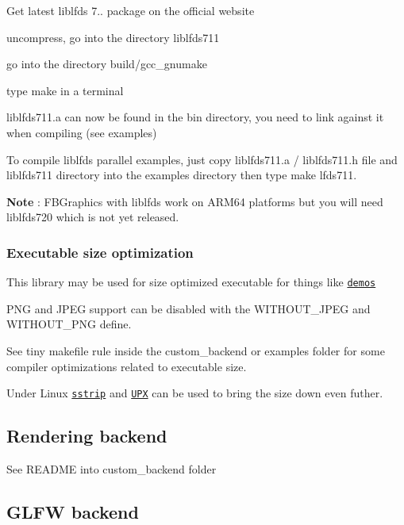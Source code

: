 \begin{DoxyItemize}
\item Get latest liblfds 7.. package on the official website
\item uncompress, go into the directory {\ttfamily liblfds711}
\item go into the directory {\ttfamily build/gcc\+\_\+gnumake}
\item type {\ttfamily make} in a terminal
\item {\ttfamily liblfds711.\+a} can now be found in the {\ttfamily bin} directory, you need to link against it when compiling (see examples)
\end{DoxyItemize}

To compile liblfds parallel examples, just copy {\ttfamily liblfds711.\+a} / {\ttfamily liblfds711.\+h} file and {\ttfamily liblfds711} directory into the {\ttfamily examples} directory then type {\ttfamily make lfds711}.

{\bfseries Note} \+: F\+B\+Graphics with liblfds work on A\+R\+M64 platforms but you will need liblfds720 which is not yet released.

\subsubsection*{Executable size optimization}

This library may be used for size optimized executable for things like \href{https://en.wikipedia.org/wiki/Demoscene}{\tt demos}

P\+NG and J\+P\+EG support can be disabled with the {\ttfamily W\+I\+T\+H\+O\+U\+T\+\_\+\+J\+P\+EG} and {\ttfamily W\+I\+T\+H\+O\+U\+T\+\_\+\+P\+NG} define.

See {\ttfamily tiny} makefile rule inside the {\ttfamily custom\+\_\+backend} or {\ttfamily examples} folder for some compiler optimizations related to executable size.

Under Linux \href{https://github.com/BR903/ELFkickers/tree/master/sstrip}{\tt sstrip} and \href{https://upx.github.io/}{\tt U\+PX} can be used to bring the size down even futher.

\subsection*{Rendering backend}

See {\ttfamily R\+E\+A\+D\+ME} into {\ttfamily custom\+\_\+backend} folder

\subsection*{G\+L\+FW backend}

